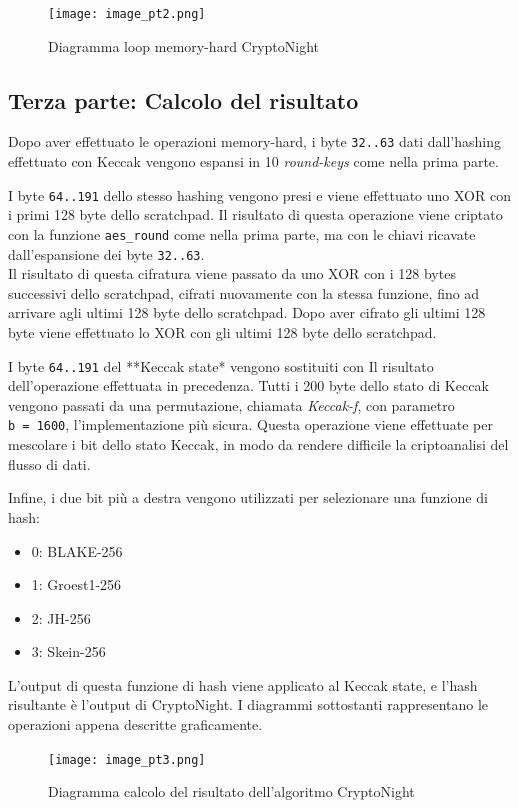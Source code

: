 \begin{figure}[h!]
  \centering
  \texttt{[image: image\_pt2.png]}
  \caption{Diagramma loop memory-hard CryptoNight}
  \label{fig:my_label}
\end{figure}

\subsection{Terza parte: Calcolo del
risultato}\label{terza-parte-calcolo-del-risultato}

Dopo aver effettuato le operazioni memory-hard, i byte \texttt{32..63}
dati dall'hashing effettuato con Keccak vengono espansi in 10
\emph{round-keys} come nella prima parte.

I byte \texttt{64..191} dello stesso hashing vengono presi e viene
effettuato uno XOR con i primi 128 byte dello scratchpad. Il risultato
di questa operazione viene criptato con la funzione \texttt{aes\_round}
come nella prima parte, ma con le chiavi ricavate dall'espansione dei
byte \texttt{32..63}.\\
Il risultato di questa cifratura viene passato da uno XOR con i 128
bytes successivi dello scratchpad, cifrati nuovamente con la stessa
funzione, fino ad arrivare agli ultimi 128 byte dello scratchpad. Dopo
aver cifrato gli ultimi 128 byte viene effettuato lo XOR con gli ultimi
128 byte dello scratchpad.

I byte \texttt{64..191} del **Keccak state* vengono sostituiti con Il
risultato dell'operazione effettuata in precedenza. Tutti i 200 byte
dello stato di Keccak vengono passati da una permutazione, chiamata
\emph{Keccak-f}, con parametro \texttt{b\ =\ 1600}, l'implementazione
più sicura. Questa operazione viene effettuate per mescolare i bit dello
stato Keccak, in modo da rendere difficile la criptoanalisi del flusso
di dati.

Infine, i due bit più a destra vengono utilizzati per selezionare una
funzione di hash:

\begin{itemize}
  \item 
  0: BLAKE-256\cite{aumasson2008sha}
  \item
  1: Groest1-256\cite{groestl}
  \item 
  2: JH-256\cite{jh}
  \item 
  3: Skein-256\cite{skein}
\end{itemize}

L'output di questa funzione di hash viene applicato al Keccak state, e
l'hash risultante è l'output di CryptoNight. I diagrammi sottostanti rappresentano le operazioni
appena descritte graficamente.

\begin{figure}[h!]
  \centering
  \texttt{[image: image\_pt3.png]}
  \caption{Diagramma calcolo del risultato dell'algoritmo CryptoNight}
  \label{fig:my_label}
\end{figure}